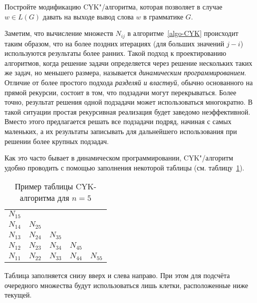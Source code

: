 \begin{myproblem} Постройте модификацию CYK"/алгоритма, которая позволяет в случае $w \in
L(G)$ давать на выходе вывод слова $w$ в грамматике $G$.
\end{myproblem}

\begin{myremark}
Заметим, что вычисление множеств $N_{ij}$ в алгоритме~\ref{algo-CYK} происходит
таким образом, что на более поздних итерациях (для больших значений $j-i$)
используются результаты более ранних. Такой подход к проектированию алгоритмов,
когда решение задачи определяется через решение нескольких таких же задач,
но меньшего размера,
называется \emph{динамическим программированием}. Отличие от более простого
подхода \emph{разделяй и властвуй}, обычно основанного на прямой рекурсии,
состоит в том, что подзадачи могут перекрываться. Более точно, результат
решения одной подзадачи может использоваться многократно. В такой ситуации
простая рекурсивная реализация будет заведомо неэффективной. Вместо этого
предлагается решать все подзадачи подряд, начиная с самых маленьких, а их
результаты записывать для дальнейшего использования при решении более
крупных подзадач.
\end{myremark}

Как это часто бывает в динамическом программировании, CYK"/алгоритм
удобно проводить с помощью заполнения некоторой таблицы
(см. таблицу~\ref{tab-cyk}).

\begin{table}[H]
\begin{center}
\begin{tabular}{|ccccc}
$N_{15}$ & & & &\\
$N_{14}$ & $N_{25}$ & & &\\
$N_{13}$ & $N_{24}$ & $N_{35}$ & &\\
$N_{12}$ & $N_{23}$ & $N_{34}$ & $N_{45}$ &\\
$N_{11}$ & $N_{22}$ & $N_{33}$ & $N_{44}$ & $N_{55}$\\
\hline
\end{tabular}
\end{center}
\caption{Пример таблицы CYK-алгоритма для $n=5$}
\label{tab-cyk}
\end{table}

\noindent Таблица заполняется снизу вверх и
слева направо. При этом для подсчёта очередного множества будут
использоваться лишь клетки, расположенные ниже текущей.

